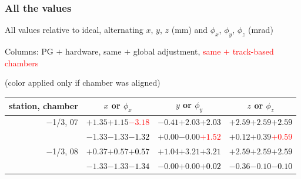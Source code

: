 \documentclass[compress]{beamer}
\begin{document}
\begin{frame}
\frametitle{All the values}
\tiny

All values relative to ideal, alternating $x$, $y$, $z$ (mm) and $\phi_x$, $\phi_y$, $\phi_z$ (mrad)

Columns: PG $+$ hardware, same $+$ global adjustment, \textcolor{red}{same $+$ track-based chambers}

\hfill (color applied only if chamber was aligned)

\vfill
\renewcommand{\arraystretch}{1.1}
\begin{tabular}{r | c | c | c}
station, chamber & $x$ or $\phi_x$ & $y$ or $\phi_y$ & $z$ or $\phi_z$ \\\hline
$-$1/3, 07 & $+1.35$\hspace{0.1 cm}$+1.15$\hspace{0.1 cm}\textcolor{red}{$-3.18$} & $-0.41$\hspace{0.1 cm}$+2.03$\hspace{0.1 cm}\textcolor{black}{$+2.03$} & $+2.59$\hspace{0.1 cm}$+2.59$\hspace{0.1 cm}\textcolor{black}{$+2.59$} \\
           & $-1.33$\hspace{0.1 cm}$-1.33$\hspace{0.1 cm}\textcolor{black}{$-1.32$} & $+0.00$\hspace{0.1 cm}$-0.00$\hspace{0.1 cm}\textcolor{red}{$+1.52$} & $+0.12$\hspace{0.1 cm}$+0.39$\hspace{0.1 cm}\textcolor{red}{$+0.59$} \\
$-$1/3, 08 & $+0.37$\hspace{0.1 cm}$+0.57$\hspace{0.1 cm}\textcolor{black}{$+0.57$} & $+1.04$\hspace{0.1 cm}$+3.21$\hspace{0.1 cm}\textcolor{black}{$+3.21$} & $+2.59$\hspace{0.1 cm}$+2.59$\hspace{0.1 cm}\textcolor{black}{$+2.59$} \\
           & $-1.33$\hspace{0.1 cm}$-1.33$\hspace{0.1 cm}\textcolor{black}{$-1.34$} & $-0.00$\hspace{0.1 cm}$+0.00$\hspace{0.1 cm}\textcolor{black}{$+0.02$} & $-0.36$\hspace{0.1 cm}$-0.10$\hspace{0.1 cm}\textcolor{black}{$-0.10$} \\

\end{tabular}
\end{frame}
\end{document}
